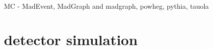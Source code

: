 













\noindent MC - MadEvent, MadGraph and madgraph\@NLO, powheg, pythia, tauola







\section{ detector simulation}

